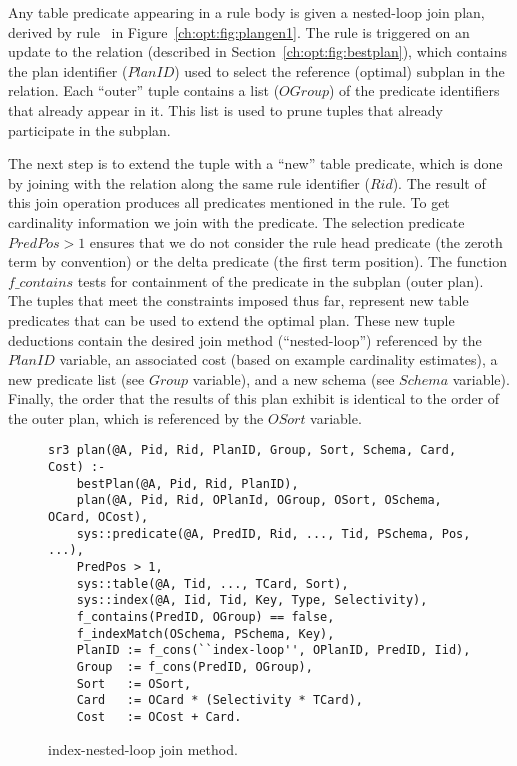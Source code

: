 Any table predicate appearing in a rule body is given a nested-loop join plan,
derived by rule~ in Figure~\ref{ch:opt:fig:plangen1}.  The rule is
triggered on an update to the  relation (described in
Section~\ref{ch:opt:fig:bestplan}), which contains the plan identifier
($PlanID$) used to select the reference (optimal) subplan in the 
relation.  Each ``outer''  tuple contains a list ($OGroup$) of the
predicate identifiers that already appear in it.  This list is used to prune
 tuples that already participate in the subplan.

The next step is to extend the  tuple with a ``new'' table predicate,
which is done by joining with the  relation along the same
rule identifier ($Rid$).  The result of this join operation produces all
predicates mentioned in the rule.  To get cardinality information we join with
the  predicate.  The selection predicate $PredPos > 1$ ensures
that we do not consider the rule head predicate (the zeroth term by convention)
or the delta predicate (the first term position).  The function $f\_contains$
tests for containment of the predicate in the subplan (outer plan).  The tuples
that meet the constraints imposed thus far, represent new table predicates that
can be used to extend the optimal plan.  These new  tuple deductions
contain the desired join method (``nested-loop'') referenced by the $PlanID$
variable, an associated cost (based on example cardinality estimates), a
new predicate list (see $Group$ variable), and a new schema (see $Schema$
variable).  Finally, the order that the results of this plan exhibit is
identical to the order of the outer plan, which is referenced by the $OSort$
variable.

\begin{figure*}
\ssp
\centering
\begin{lstlisting}
sr3 plan(@A, Pid, Rid, PlanID, Group, Sort, Schema, Card, Cost) :-
    bestPlan(@A, Pid, Rid, PlanID),
    plan(@A, Pid, Rid, OPlanId, OGroup, OSort, OSchema, OCard, OCost),
    sys::predicate(@A, PredID, Rid, ..., Tid, PSchema, Pos, ...),
    PredPos > 1,
    sys::table(@A, Tid, ..., TCard, Sort),
    sys::index(@A, Iid, Tid, Key, Type, Selectivity),
    f_contains(PredID, OGroup) == false,
    f_indexMatch(OSchema, PSchema, Key),
    PlanID := f_cons(``index-loop'', OPlanID, PredID, Iid),
    Group  := f_cons(PredID, OGroup),
    Sort   := OSort,
    Card   := OCard * (Selectivity * TCard),
    Cost   := OCost + Card.
\end{lstlisting}
\caption{\label{ch:opt:fig:plangen2}index-nested-loop join method.}
\end{figure*}

